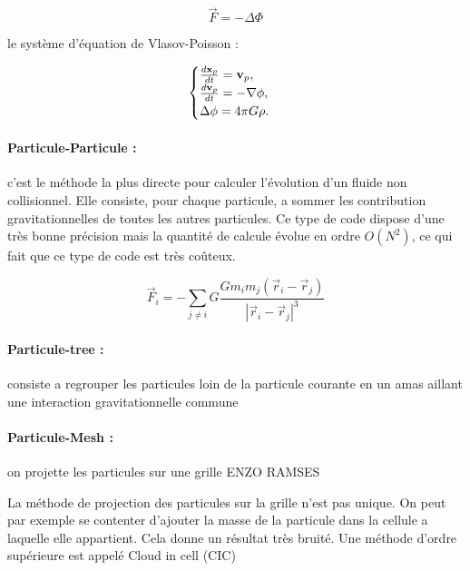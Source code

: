 \begin{equation}
\vec{F}=-\Delta \Phi
\end{equation}

le système d'équation de Vlasov-Poisson :

\begin{equation}
\begin{cases}

\frac{d{\bf x}_p}{dt} = {\bf v}_p, \\
\frac{d{\bf v}_p}{dt} = -\nabla \phi , \\
\Delta \phi= 4\pi G \rho.

\end{cases}
\label{eq:Ncorps}
\end{equation}


\paragraph{Particule-Particule : } c'est le méthode la plus directe pour calculer l'évolution d'un fluide non collisionnel. 
Elle consiste, pour chaque particule, a sommer les contribution gravitationnelles de toutes les autres particules.
Ce type de code dispose d'une très bonne précision mais la quantité de calcule évolue en ordre $O(N^2)$, ce qui fait que ce type de code est très coûteux.

\begin{equation}
\vec{F}_i=-\sum_{j\neq i} G \frac{G m_i m_j(\vec{r}_i - \vec{r}_j) }{ |\vec{r}_i - \vec{r}_j |^3}
\end{equation}

\paragraph{Particule-tree : } consiste a regrouper les particules loin de la particule courante en un amas aillant une interaction gravitationnelle commune

\paragraph{Particule-Mesh : } on projette les particules sur une grille
ENZO %
RAMSES

La méthode de projection des particules sur la grille n'est pas unique.
On peut par exemple se contenter d'ajouter la masse de la particule dans la cellule a laquelle elle appartient.
Cela donne un résultat très bruité.
Une méthode d'ordre supérieure est appelé Cloud in cell (CIC)

